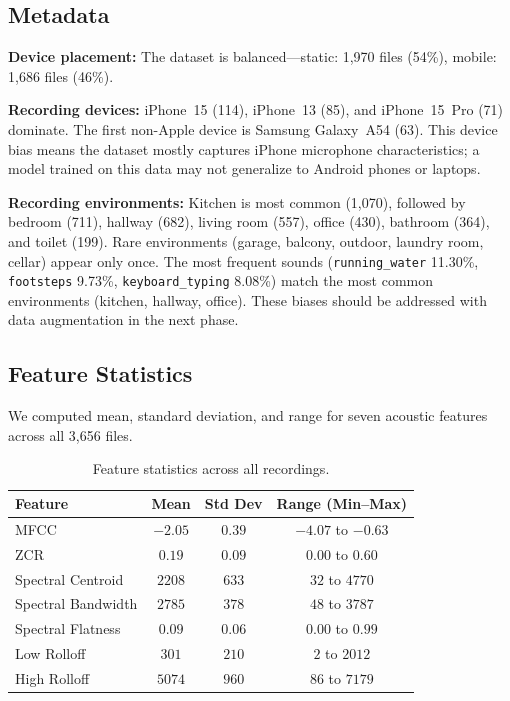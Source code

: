 \documentclass{article}
\begin{document}
\subsection{Metadata}

\textbf{Device placement:} The dataset is balanced---static: 1,970 files (54\%), mobile: 1,686 files (46\%).

\textbf{Recording devices:} iPhone~15 (114), iPhone~13 (85), and iPhone~15~Pro (71) dominate. The first non-Apple device is Samsung Galaxy~A54 (63). This device bias means the dataset mostly captures iPhone microphone characteristics; a model trained on this data may not generalize to Android phones or laptops.

\textbf{Recording environments:} Kitchen is most common (1,070), followed by bedroom (711), hallway (682), living room (557), office (430), bathroom (364), and toilet (199). Rare environments (garage, balcony, outdoor, laundry room, cellar) appear only once. The most frequent sounds (\texttt{running\_water} 11.30\%, \texttt{footsteps} 9.73\%, \texttt{keyboard\_typing} 8.08\%) match the most common environments (kitchen, hallway, office). These biases should be addressed with data augmentation in the next phase.

\subsection{Feature Statistics}

We computed mean, standard deviation, and range for seven acoustic features across all 3,656 files.

\begin{table}[h]
  \caption{Feature statistics across all recordings.}
  \label{tab:featstats}
  \centering
  \small
  \begin{tabular}{lccc}
    \toprule
    Feature & Mean & Std Dev & Range (Min--Max) \\
    \midrule
    MFCC              & $-2.05$ & $0.39$  & $-4.07$ to $-0.63$ \\
    ZCR               & $0.19$  & $0.09$  & $0.00$ to $0.60$ \\
    Spectral Centroid  & $2208$  & $633$   & $32$ to $4770$ \\
    Spectral Bandwidth & $2785$  & $378$   & $48$ to $3787$ \\
    Spectral Flatness  & $0.09$  & $0.06$  & $0.00$ to $0.99$ \\
    Low Rolloff        & $301$   & $210$   & $2$ to $2012$ \\
    High Rolloff       & $5074$  & $960$   & $86$ to $7179$ \\
    \bottomrule
  \end{tabular}
\end{table}
\end{document}

